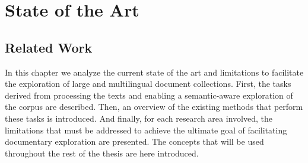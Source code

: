 

\chapter{State of the Art}\label{ch:soa}

\graphicspath{{soa/figures/}}


\section{Related Work}\label{sect:related-work}

In this chapter we analyze the current state of the art and limitations to facilitate the exploration of large and multilingual document collections. First, the tasks derived from processing the texts and enabling a semantic-aware exploration of the corpus are described. Then, an overview of the existing methods that perform these tasks is introduced. And finally, for each research area involved, the limitations that must be addressed to achieve the ultimate goal of facilitating documentary exploration are presented. The concepts that will be used throughout the rest of the thesis are here introduced. 

